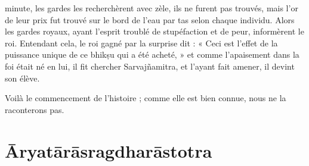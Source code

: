 \documentclass[a4paper, 11pt, oneside, french, landscape, twocolumn]{article}
\begin{document}
minute, les gardes les recherchèrent avec zèle, ils ne furent pas trouvés, mais l'or de leur prix fut trouvé sur le bord de l'eau par tas selon chaque individu. Alors les gardes royaux, ayant l'esprit troublé de stupéfaction et de peur, informèrent le roi. Entendant cela, le roi gagné par la surprise dit : « Ceci est l'effet de la puissance unique de ce bhik\d{s}u qui a été acheté, » et comme l'apaisement dans la foi était né en lui, il fit chercher Sarvaj\~{n}amitra, et l'ayant fait amener, il devint son élève.

Voilà le commencement de l'histoire ; comme elle est bien connue, nous ne la raconterons pas.
\clearpage
\section{\={A}ryat\={a}r\={a}sragdhar\={a}stotra}
\end{document}
